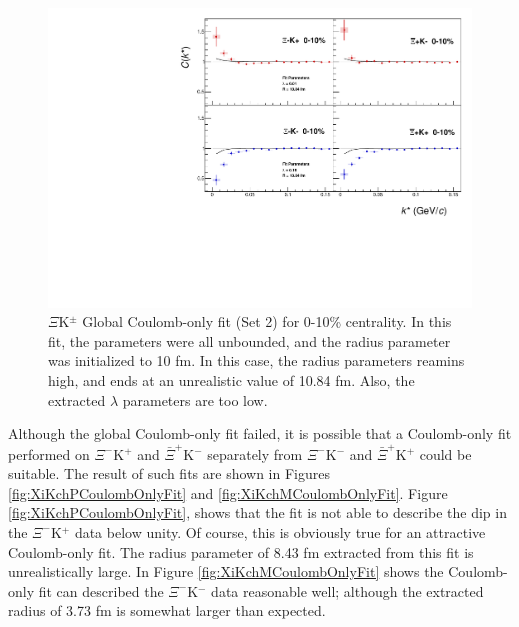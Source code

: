 \documentclass[/home/jesse/Analysis/FemtoAnalysis/AnalysisNotes/AnalysisNoteJBuxton.tex]{subfiles}
\begin{document}
\begin{figure}[h]
  \centering
  \includegraphics[width=\textwidth]{7_ResultsAndDiscussion/Figures/GlobalCoulombOnlyFit_Set2.pdf}
  \caption[$\Xi$K$^{\pm}$ Global Coulomb-Only Fit (Set 2)]{$\Xi$K$^{\pm}$ Global Coulomb-only fit (Set 2) for 0-10\% centrality.  In this fit, the parameters were all unbounded, and the radius parameter was initialized to 10 fm.  In this case, the radius parameters reamins high, and ends at an unrealistic value of 10.84 fm.  Also, the extracted $\lambda$ parameters are too low.}
  \label{fig:XiKchGlobalCoulombOnlySet2}
\end{figure}

Although the global Coulomb-only fit failed, it is possible that a Coulomb-only fit performed on $\Xi^{-}$K$^{+}$ and $\bar{\Xi}^{+}$K$^{-}$ separately from $\Xi^{-}$K$^{-}$ and $\bar{\Xi}^{+}$K$^{+}$ could be suitable.  The result of such fits are shown in Figures \ref{fig:XiKchPCoulombOnlyFit} and \ref{fig:XiKchMCoulombOnlyFit}.  Figure \ref{fig:XiKchPCoulombOnlyFit}, shows that the fit is not able to describe the dip in the $\Xi^{-}$K$^{+}$ data below unity.  Of course, this is obviously true for an attractive Coulomb-only fit.  The radius parameter of 8.43 fm extracted from this fit is unrealistically large.  In Figure \ref{fig:XiKchMCoulombOnlyFit} shows the Coulomb-only fit can described the $\Xi^{-}$K$^{-}$ data reasonable well; although the extracted radius of 3.73 fm is somewhat larger than expected.
\end{document}
